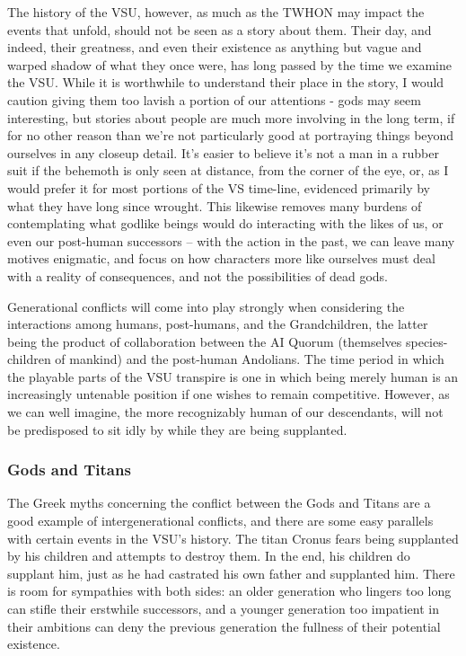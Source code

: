 The history of the VSU, however, as much as the TWHON may impact the
events that unfold, should not be seen as a story about them. Their
day, and indeed, their greatness, and even their existence as anything
but vague and warped shadow of what they once were, has long passed by
the time we examine the VSU. While it is worthwhile to understand
their place in the story, I would caution giving them too lavish a
portion of our attentions - gods may seem interesting, but stories
about people are much more involving in the long term, if for no other
reason than we're not particularly good at portraying things beyond
ourselves in any closeup detail. It's easier to believe it's not a man
in a rubber suit if the behemoth is only seen at distance, from the
corner of the eye, or, as I would prefer it for most portions of the
VS time-line, evidenced primarily by what they have long since
wrought. This likewise removes many burdens of contemplating what
godlike beings would do interacting with the likes of us, or even our
post-human successors -- with the action in the past, we can leave
many motives enigmatic, and focus on how characters more like
ourselves must deal with a reality of consequences, and not the
possibilities of dead gods.

Generational conflicts will come into play strongly when considering
the interactions among humans, post-humans, and the Grandchildren, the
latter being the product of collaboration between the AI Quorum
(themselves species-children of mankind) and the post-human
Andolians. The time period in which the playable parts of the VSU
transpire is one in which being merely human is an increasingly
untenable position if one wishes to remain competitive. However, as we
can well imagine, the more recognizably human of our descendants,
will not be predisposed to sit idly by while they are being
supplanted.

\subsubsection{Gods and Titans}

The Greek myths concerning the conflict between the Gods and Titans
are a good example of intergenerational conflicts, and there are some
easy parallels with certain events in the VSU's history. The titan
Cronus fears being supplanted by his children and attempts to destroy
them. In the end, his children do supplant him, just as he had
castrated his own father and supplanted him. There is room for
sympathies with both sides: an older generation who lingers too long
can stifle their erstwhile successors, and a younger generation too
impatient in their ambitions can deny the previous generation the
fullness of their potential existence.

